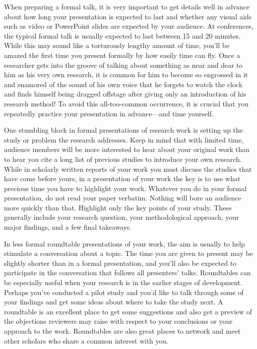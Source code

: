 When preparing a formal talk, it is very important to get details well in advance about how long your presentation is expected to last and whether any visual aids such as video or PowerPoint slides are expected by your audience. At conferences, the typical formal talk is usually expected to last between 15 and 20 minutes. While this may sound like a torturously lengthy amount of time, you’ll be amazed the first time you present formally by how easily time can fly. Once a researcher gets into the groove of talking about something as near and dear to him as his very own research, it is common for him to become so engrossed in it and enamored of the sound of his own voice that he forgets to watch the clock and finds himself being dragged offstage after giving only an introduction of his research method! To avoid this all-too-common occurrence, it is crucial that you repeatedly practice your presentation in advance—and time yourself.

One stumbling block in formal presentations of research work is setting up the study or problem the research addresses. Keep in mind that with limited time, audience members will be more interested to hear about your original work than to hear you cite a long list of previous studies to introduce your own research. While in scholarly written reports of your work you must discuss the studies that have come before yours, in a presentation of your work the key is to use what precious time you have to highlight your work. Whatever you do in your formal presentation, do not read your paper verbatim. Nothing will bore an audience more quickly than that. Highlight only the key points of your study. These generally include your research question, your methodological approach, your major findings, and a few final takeaways.

In less formal roundtable presentations of your work, the aim is usually to help stimulate a conversation about a topic. The time you are given to present may be slightly shorter than in a formal presentation, and you’ll also be expected to participate in the conversation that follows all presenters’ talks. Roundtables can be especially useful when your research is in the earlier stages of development. Perhaps you’ve conducted a pilot study and you’d like to talk through some of your findings and get some ideas about where to take the study next. A roundtable is an excellent place to get some suggestions and also get a preview of the objections reviewers may raise with respect to your conclusions or your approach to the work. Roundtables are also great places to network and meet other scholars who share a common interest with you.

